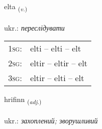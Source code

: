 \documentclass[frontgrid, backgrid]{flacards}\usepackage[]{graphicx}\usepackage[]{xcolor}
\begin{document}
\renewcommand{\flhead}{\vskip5pt \fboxsep=0pt {\small\bfseries\footnotesize Sagnorð | дієслово}}
\renewcommand{\fcfoot}{\vskip5pt \fboxsep=0pt \hspace{2pt}{\small\bfseries\footnotesize 3K}}

\renewcommand{\blhead}{\vskip5pt {\small\bfseries\footnotesize Sagnorð | дієслово }}
\renewcommand{\bcfoot}{\vskip5pt \hspace{2pt}{\small\bfseries\footnotesize 3K}}


{elta \small{\textsubscript{(\textit{v.})}} \\[1ex] %
\textphonetic{[ɛl̥ta]} \\
ukr.: \emph{переслідувати} \\  [2ex]
\renewcommand*{\arraystretch}{0.8}
\begin{tabular}{p{1cm}l}
\textsc{1sg}: & elti -- elti -- elt \\ 
\textsc{2sg}: & eltir -- eltir -- elt \\ 
\textsc{3sg}: & eltir -- elti -- elt \\ 
\end{tabular}
}

\renewcommand{\flhead}{\vskip5pt \fboxsep=0pt {\small\bfseries\footnotesize Lýsingarorð | прикметник}}
\renewcommand{\fcfoot}{\vskip5pt \fboxsep=0pt \hspace{2pt}{\small\bfseries\footnotesize 3K}}

\renewcommand{\blhead}{\vskip5pt {\small\bfseries\footnotesize Lýsingarorð | прикметник }}
\renewcommand{\bcfoot}{\vskip5pt \hspace{2pt}{\small\bfseries\footnotesize 3K}}


{hrifinn \small{\textsubscript{(\textit{adj.})}} \\[1ex] %
\textphonetic{[r̥ɪːvɪn]} \\
ukr.: \emph{захоплений; зворушливий} \\  [2ex]
\renewcommand*{\arraystretch}{0.8}
}
\end{document}
